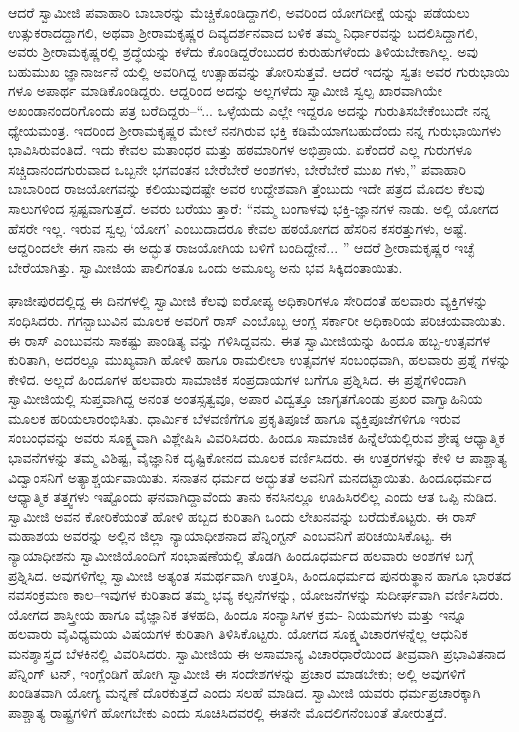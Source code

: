 ಆದರೆ ಸ್ವಾಮೀಜಿ ಪವಾಹಾರಿ ಬಾಬಾರನ್ನು ಮೆಚ್ಚಿಕೊಂಡಿದ್ದಾಗಲಿ, ಅವರಿಂದ ಯೋಗದೀಕ್ಷೆ ಯನ್ನು ಪಡೆಯಲು ಉತ್ಸುಕರಾದದ್ದಾಗಲಿ, ಅಥವಾ ಶ್ರೀರಾಮಕೃಷ್ಣರ ದಿವ್ಯದರ್ಶನವಾದ ಬಳಿಕ ತಮ್ಮ ನಿರ್ಧಾರವನ್ನು ಬದಲಿಸಿದ್ದಾಗಲಿ, ಅವರು ಶ್ರೀರಾಮಕೃಷ್ಣರಲ್ಲಿ ಶ್ರದ್ಧೆಯನ್ನು ಕಳೆದು ಕೊಂಡಿದ್ದರೆಂಬುದರ ಕುರುಹುಗಳೆಂದು ತಿಳಿಯಬೇಕಾಗಿಲ್ಲ. ಅವು ಬಹುಮುಖ ಜ್ಞಾನಾರ್ಜನೆ ಯಲ್ಲಿ ಅವರಿಗಿದ್ದ ಉತ್ಸಾಹವನ್ನು ತೋರಿಸುತ್ತವೆ. ಆದರೆ ಇದನ್ನು ಸ್ವತಃ ಅವರ ಗುರುಭಾಯಿ ಗಳೂ ಅಪಾರ್ಥ ಮಾಡಿಕೊಂಡಿದ್ದರು. ಆದ್ದರಿಂದ ಅದನ್ನು ಅಲ್ಲಗಳೆದು ಸ್ವಾಮೀಜಿ ಸ್ವಲ್ಪ ಖಾರವಾಗಿಯೇ ಅಖಂಡಾನಂದರಿಗೊಂದು ಪತ್ರ ಬರೆದಿದ್ದರು–“... ಒಳ್ಳೆಯದು ಎಲ್ಲೇ ಇದ್ದರೂ ಅದನ್ನು ಗುರುತಿಸಬೇಕೆಂಬುದೇ ನನ್ನ ಧ್ಯೇಯಮಂತ್ರ. ಇದರಿಂದ ಶ್ರೀರಾಮಕೃಷ್ಣರ ಮೇಲೆ ನನಗಿರುವ ಭಕ್ತಿ ಕಡಿಮೆಯಾಗಬಹುದೆಂದು ನನ್ನ ಗುರುಭಾಯಿಗಳು ಭಾವಿಸಿರುವಂತಿದೆ. ಇದು ಕೇವಲ ಮತಾಂಧರ ಮತ್ತು ಹಠಮಾರಿಗಳ ಅಭಿಪ್ರಾಯ. ಏಕೆಂದರೆ ಎಲ್ಲ ಗುರುಗಳೂ ಸಚ್ಚಿದಾನಂದಗುರುವಾದ ಒಬ್ಬನೇ ಭಗವಂತನ ಬೇರೆಬೇರೆ ಅಂಶಗಳು, ಬೇರೆಬೇರೆ ಮುಖ ಗಳು,” ಪವಾಹಾರಿ ಬಾಬಾರಿಂದ ರಾಜಯೋಗವನ್ನು ಕಲಿಯುವುದಷ್ಟೇ ಅವರ ಉದ್ದೇಶವಾಗಿ ತ್ತೆಂಬುದು ಇದೇ ಪತ್ರದ ಮೊದಲ ಕೆಲವು ಸಾಲುಗಳಿಂದ ಸ್ಪಷ್ಟವಾಗುತ್ತದೆ. ಅವರು ಬರೆಯು ತ್ತಾರೆ: “ನಮ್ಮ ಬಂಗಾಳವು ಭಕ್ತಿ-ಜ್ಞಾನಗಳ ನಾಡು. ಅಲ್ಲಿ ಯೋಗದ ಹೆಸರೇ ಇಲ್ಲ. ಇರುವ ಸ್ವಲ್ಪ ‘ಯೋಗ’ ಎಂಬುದಾದರೂ ಕೇವಲ ಹಠಯೋಗದ ಹೆಸರಿನ ಕಸರತ್ತುಗಳು, ಅಷ್ಟೆ. ಆದ್ದರಿಂದಲೇ ಈಗ ನಾನು ಈ ಅದ್ಭುತ ರಾಜಯೋಗಿಯ ಬಳಿಗೆ ಬಂದಿದ್ದೇನೆ... ” ಆದರೆ ಶ್ರೀರಾಮಕೃಷ್ಣರ ಇಚ್ಛೆ ಬೇರೆಯಾಗಿತ್ತು. ಸ್ವಾಮೀಜಿಯ ಪಾಲಿಗಂತೂ ಒಂದು ಅಮೂಲ್ಯ ಅನು ಭವ ಸಿಕ್ಕಿದಂತಾಯಿತು.

ಘಾಜೀಪುರದಲ್ಲಿದ್ದ ಈ ದಿನಗಳಲ್ಲಿ ಸ್ವಾಮೀಜಿ ಕೆಲವು ಐರೋಪ್ಯ ಅಧಿಕಾರಿಗಳೂ ಸೇರಿದಂತೆ ಹಲವಾರು ವ್ಯಕ್ತಿಗಳನ್ನು ಸಂಧಿಸಿದರು. ಗಗನ್ಬಾಬುವಿನ ಮೂಲಕ ಅವರಿಗೆ ರಾಸ್ ಎಂಬೊಬ್ಬ ಆಂಗ್ಲ ಸರ್ಕಾರೀ ಅಧಿಕಾರಿಯ ಪರಿಚಯವಾಯಿತು. ಈ ರಾಸ್ ಎಂಬುವನು ಸಾಕಷ್ಟು ಪಾಂಡಿತ್ಯ ವನ್ನು ಗಳಿಸಿದ್ದವನು. ಈತ ಸ್ವಾಮೀಜಿಯನ್ನು ಹಿಂದೂ ಹಬ್ಬ-ಉತ್ಸವಗಳ ಕುರಿತಾಗಿ, ಅದರಲ್ಲೂ ಮುಖ್ಯವಾಗಿ ಹೋಳಿ ಹಾಗೂ ರಾಮಲೀಲಾ ಉತ್ಸವಗಳ ಸಂಬಂಧವಾಗಿ, ಹಲವಾರು ಪ್ರಶ್ನೆ ಗಳನ್ನು ಕೇಳಿದ. ಅಲ್ಲದೆ ಹಿಂದೂಗಳ ಹಲವಾರು ಸಾಮಾಜಿಕ ಸಂಪ್ರದಾಯಗಳ ಬಗೆಗೂ ಪ್ರಶ್ನಿಸಿದ. ಈ ಪ್ರಶ್ನೆಗಳಿಂದಾಗಿ ಸ್ವಾಮೀಜಿಯಲ್ಲಿ ಸುಪ್ತವಾಗಿದ್ದ ಅನಂತ ಅಂತಸ್ಸತ್ವವೂ, ಅಪಾರ ವಿದ್ವತ್ತೂ ಜಾಗೃತಗೊಂಡು ಪ್ರಖರ ವಾಗ್ವಾಹಿನಿಯ ಮೂಲಕ ಹರಿಯಲಾರಂಭಿಸಿತು. ಧಾರ್ಮಿಕ ಬೆಳವಣಿಗೆಗೂ ಪ್ರಕೃತಿಪೂಜೆ ಹಾಗೂ ವ್ಯಕ್ತಿಪೂಜೆಗಳಿಗೂ ಇರುವ ಸಂಬಂಧವನ್ನು ಅವರು ಸೂಕ್ಷ್ಮವಾಗಿ ವಿಶ್ಲೇಷಿಸಿ ವಿವರಿಸಿದರು. ಹಿಂದೂ ಸಾಮಾಜಿಕ ಹಿನ್ನೆಲೆಯಲ್ಲಿರುವ ಶ್ರೇಷ್ಠ ಆಧ್ಯಾತ್ಮಿಕ ಭಾವನೆಗಳನ್ನು ತಮ್ಮ ವಿಶಿಷ್ಟ, ವೈಜ್ಞಾನಿಕ ದೃಷ್ಟಿಕೋನದ ಮೂಲಕ ವರ್ಣಿಸಿದರು. ಈ ಉತ್ತರಗಳನ್ನು ಕೇಳಿ ಆ ಪಾಶ್ಚಾತ್ಯ ವಿದ್ವಾಂಸನಿಗೆ ಅತ್ಯಾಶ್ಚರ್ಯವಾಯಿತು. ಸನಾತನ ಧರ್ಮದ ಅದ್ಭುತತೆ ಅವನಿಗೆ ಮನದಟ್ಟಾಯಿತು. ಹಿಂದೂಧರ್ಮದ ಆಧ್ಯಾತ್ಮಿಕ ತತ್ತ್ವಗಳು ಇಷ್ಟೊಂದು ಘನವಾಗಿದ್ದಾವೆಂದು ತಾನು ಕನಸಿನಲ್ಲೂ ಊಹಿಸಿರಲಿಲ್ಲ ಎಂದು ಆತ ಒಪ್ಪಿ ನುಡಿದ. ಸ್ವಾಮೀಜಿ ಅವನ ಕೋರಿಕೆಯಂತೆ ಹೋಳಿ ಹಬ್ಬದ ಕುರಿತಾಗಿ ಒಂದು ಲೇಖನವನ್ನು ಬರೆದುಕೊಟ್ಟರು. ಈ ರಾಸ್ ಮಹಾಶಯ ಅವರನ್ನು ಅಲ್ಲಿನ ಜಿಲ್ಲಾ ನ್ಯಾಯಾಧೀಶನಾದ ಪೆನ್ನಿಂಗ್ಟನ್ ಎಂಬವನಿಗೆ ಪರಿಚಯಿಸಿಕೊಟ್ಟ. ಈ ನ್ಯಾಯಾಧೀಶನು ಸ್ವಾಮೀಜಿಯೊಂದಿಗೆ ಸಂಭಾಷಣೆಯಲ್ಲಿ ತೊಡಗಿ ಹಿಂದೂಧರ್ಮದ ಹಲವಾರು ಅಂಶಗಳ ಬಗ್ಗೆ ಪ್ರಶ್ನಿಸಿದ. ಅವುಗಳಿಗೆಲ್ಲ ಸ್ವಾಮೀಜಿ ಅತ್ಯಂತ ಸಮರ್ಥವಾಗಿ ಉತ್ತರಿಸಿ, ಹಿಂದೂಧರ್ಮದ ಪುನರುತ್ಥಾನ ಹಾಗೂ ಭಾರತದ ನವಸಂಕ್ರಮಣ ಕಾಲ–ಇವುಗಳ ಕುರಿತಾದ ತಮ್ಮ ಭವ್ಯ ಕಲ್ಪನೆಗಳನ್ನು, ಯೋಜನೆಗಳನ್ನು ಸುದೀರ್ಘವಾಗಿ ವರ್ಣಿಸಿದರು. ಯೋಗದ ಶಾಸ್ತ್ರೀಯ ಹಾಗೂ ವೈಜ್ಞಾನಿಕ ತಳಹದಿ, ಹಿಂದೂ ಸಂನ್ಯಾಸಿಗಳ ಕ್ರಮ- ನಿಯಮಗಳು ಮತ್ತು ಇನ್ನೂ ಹಲವಾರು ವೈವಿಧ್ಯಮಯ ವಿಷಯಗಳ ಕುರಿತಾಗಿ ತಿಳಿಸಿಕೊಟ್ಟರು. ಯೋಗದ ಸೂಕ್ಷ್ಮವಿಚಾರಗಳನ್ನೆಲ್ಲ ಆಧುನಿಕ ಮನಶ್ಶಾಸ್ತ್ರದ ಬೆಳಕಿನಲ್ಲಿ ವಿವರಿಸಿದರು. ಸ್ವಾಮೀಜಿಯ ಈ ಅಸಾಮಾನ್ಯ ವಿಚಾರಧಾರೆಯಿಂದ ತೀವ್ರವಾಗಿ ಪ್ರಭಾವಿತನಾದ ಪೆನ್ನಿಂಗ್ ಟನ್, ಇಂಗ್ಲೆಂಡಿಗೆ ಹೋಗಿ ಸ್ವಾಮೀಜಿ ಈ ಸಂದೇಶಗಳನ್ನು ಪ್ರಚಾರ ಮಾಡಬೇಕು; ಅಲ್ಲಿ ಅವುಗಳಿಗೆ ಖಂಡಿತವಾಗಿ ಯೋಗ್ಯ ಮನ್ನಣೆ ದೊರಕುತ್ತದೆ ಎಂದು ಸಲಹೆ ಮಾಡಿದ. ಸ್ವಾಮೀಜಿ ಯವರು ಧರ್ಮಪ್ರಚಾರಕ್ಕಾಗಿ ಪಾಶ್ಚಾತ್ಯ ರಾಷ್ಟ್ರಗಳಿಗೆ ಹೋಗಬೇಕು ಎಂದು ಸೂಚಿಸಿದವರಲ್ಲಿ ಈತನೇ ಮೊದಲಿಗನೆಂಬಂತೆ ತೋರುತ್ತದೆ.

